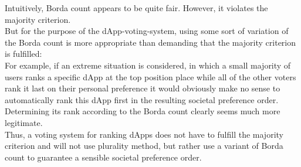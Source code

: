 Intuitively, Borda count appears to be quite fair. However, it violates the majority criterion. \\
But for the purpose of the dApp-voting-system, using some sort of variation of the Borda count is more appropriate than demanding that the majority criterion is fulfilled: 
\\For example, if an extreme situation is considered, in which a small majority of users ranks a specific dApp at the top position place while all of the other voters rank it last on their personal preference it would obviously make no sense to automatically rank this dApp first in the resulting societal preference order. Determining its rank according to the Borda count clearly seems much more legitimate. \\
Thus, a voting system for ranking dApps does not have to fulfill the majority criterion and will not use plurality method, but rather use a variant of Borda count to guarantee a sensible societal preference order. \\
 
